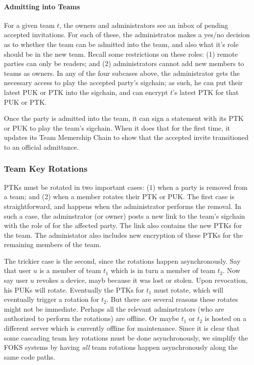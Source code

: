 \paragraph{Admitting into Teams}

For a given team $t$, the owners and administrators see an inbox of pending
accepted invitations. For each of these, the administratos makes a yes/no
decision as to whether the team can be admitted into the team, and also what
it's role should be in the new team. Recall some restrictions on these roles: 
(1) remote parties can only be readers; and (2) administrators cannot add new
members to teams as owners. In any of the four subcases above, the administrator
gets the necessary access to play the accepted party's sigchain; as such,
he can put their latest PUK or PTK into the sigchain, and can encrypt
$t$'s latest PTK for that PUK or PTK.

Once the party is admitted into the team, it can sign a statement with its PTK
or PUK to play the team's sigchain. When it does that for the first time, it
updates its Team Memership Chain to show that the accepted invite transitioned
to an official admittance. 

\subsubsection{Team Key Rotations}
\label{sec:clkr}

PTKs must be rotated in two important cases: (1) when a party is removed from a team; and (2)
when a member rotates their PTK or PUK. The first case is straightforward, and happens
when the administrator performs the removal. In such a case, the adminstrator (or owner)
posts a new link to the team's sigchain with the role of \none{} for the affected party.
The link also contains the new PTKs for the team. The administator also includes
new encryption of these PTKs for the remaining members of the team.

The trickier case is the second, since the rotations happen asynchronously. Say
that user $u$ is a member of team $t_1$ which is in turn a member of team $t_2$.
Now say user $u$ revokes a device, mayb because it was lost or stolen. Upon
revocation, his PUKs will rotate. Eventually the PTKs for $t_1$ must rotate,
which will eventually trigger a rotation for $t_2$. But there are several
reasons these rotates might not be immediate. Perhaps all the relevant
adminstrators (who are authorized to perform the rotations) are offline. Or
maybe $t_1$ or $t_2$ is hosted on a different server which is currently offline
for maintenance. Since it is clear that some cascading team key rotations must
be done asynchronously, we simplify the FOKS systems by having \textit{all} team
rotations happen asynchronously along the same code paths.

